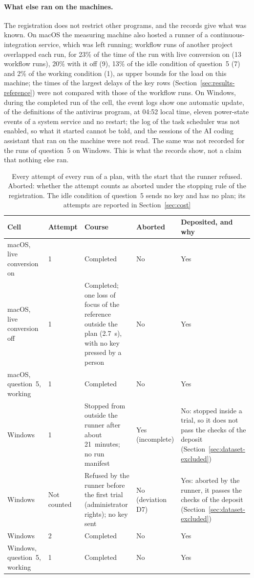 \paragraph{What else ran on the machines.} The registration does not restrict other programs, and the records give what
was known. On macOS the measuring machine also hosted a runner of a continuous-integration service, which was left
running; workflow runs of another project overlapped each run, for 23\% of the time of the run with live conversion on
(13 workflow runs), 20\% with it off (9), 13\% of the idle condition of question~5 (7) and 2\% of the working condition
(1), as upper bounds for the load on this machine; the times of the largest delays of the key rows
(Section~\ref{sec:results-reference}) were not compared with those of the workflow runs. On Windows, during the
completed run of the cell, the event logs show
one automatic update, of the definitions of the antivirus program, at 04:52 local time, eleven power-state events of a
system service and no restart; the log of the task scheduler was not enabled, so what it started cannot be told, and the
sessions of the AI coding assistant that ran on the machine were not read. The same was not recorded for the runs of
question~5 on Windows. This is what the records show, not a claim that nothing else ran.

\begin{table}[t]
\caption{Every attempt of every run of a plan, with the start that the runner refused. Aborted: whether the attempt
counts as aborted under the stopping rule of the registration. The idle condition of question~5 sends no key and has no
plan; its attempts are reported in Section~\ref{sec:cost}}
\label{tab:attempts}
\begin{tabular}{L{0.17}L{0.13}L{0.32}L{0.12}L{0.26}}
\toprule
Cell & Attempt & Course & Aborted & Deposited, and why \\
\midrule
macOS, live conversion on & 1 & Completed & No & Yes \\
macOS, live conversion off & 1 & Completed; one loss of focus of the reference outside the plan (2.7~s), with no key
pressed by a person & No & Yes \\
macOS, question~5, working & 1 & Completed & No & Yes \\
Windows & 1 & Stopped from outside the runner after about 21~minutes; no run manifest & Yes (incomplete) & No: stopped
inside a trial, so it does not pass the checks of the deposit (Section~\ref{sec:dataset-excluded}) \\
Windows & Not counted & Refused by the runner before the first trial (administrator rights); no key sent & No
(deviation D7) & Yes: aborted by the runner, it passes the checks of the deposit
(Section~\ref{sec:dataset-excluded}) \\
Windows & 2 & Completed & No & Yes \\
Windows, question~5, working & 1 & Completed & No & Yes \\
\bottomrule
\end{tabular}
\end{table}

